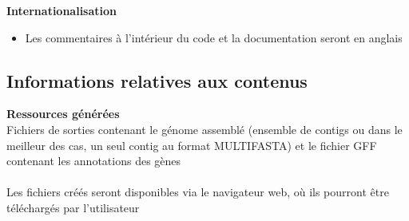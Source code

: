 \textbf{Internationalisation}

\begin{itemize}
\setlength{\itemindent}{.2in}
\item Les commentaires à l’intérieur du code et la documentation seront en anglais
\end{itemize}

\subsection{Informations relatives aux contenus}


\textbf{Ressources générées} \\
\forceindent Fichiers de sorties contenant le génome assemblé (ensemble de contigs ou dans le meilleur des cas, un seul contig au format MULTIFASTA) et le fichier GFF contenant les annotations des gènes
\\[0.5cm]
\\ 
 \forceindent Les fichiers créés seront disponibles via le navigateur web, où ils pourront être téléchargés par l’utilisateur 


